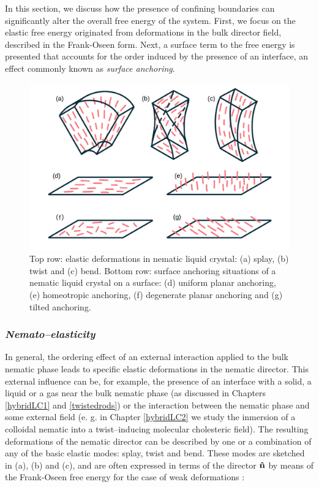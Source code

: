 In this section, we discuss how the presence of confining boundaries can significantly alter the overall free energy of the system. First, we focus on the elastic free energy originated from deformations in the bulk director field, described in the Frank-Oseen form. Next, a surface term to the free energy is presented that accounts for the order induced by the presence of an interface, an effect commonly known as {\em surface anchoring}.

\begin{figure}
\begin{center}
\includegraphics[width= .9\columnwidth]{figures/chapter-1/elasticmodes}
\caption[Elastic deformations and surface anchoring types]{ \label{elasticmodes} Top row: elastic deformations in nematic liquid crystal: (a) splay, (b) twist and (c) bend. Bottom row: surface anchoring situations of a nematic liquid crystal on a surface: (d) uniform planar anchoring, (e) homeotropic anchoring, (f) degenerate planar anchoring and (g) tilted anchoring.}
\end{center}
\end{figure}

\subsubsection{\em {Nemato--elasticity}}

In general, the ordering effect of an external interaction applied to the bulk nematic phase leads to specific elastic deformations in the nematic director. This external influence can be, for example, the presence of an interface with a solid, a liquid or a gas near the bulk nematic phase (as discussed in Chapters \ref{hybridLC1} and \ref{twistedrods}) or the interaction between the nematic phase and some external field (e. g. in Chapter \ref{hybridLC2} we study the inmersion of a colloidal nematic into a twist--inducing molecular cholesteric field). The resulting deformations of the nematic director can be described by one or a combination of any of the basic elastic modes: splay, twist and bend. These modes are sketched in  (a), (b) and (c), and are often expressed in terms of the director ${\bf \hat{n}}$ by means of the Frank-Oseen free energy for the case of weak deformations \cite{gennes-prost}:

